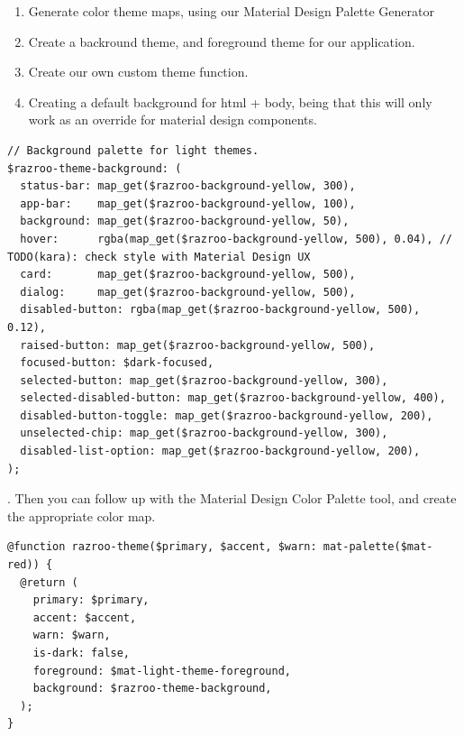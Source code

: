 \begin{enumerate}
  \item Generate color theme maps, using our Material Design Palette Generator
  \item Create a backround theme, and foreground theme for our application.
  \item Create our own custom theme function.
  \item Creating a default background for html + body, being that this will 
  only work as an override for material design components. 
\end{enumerate}

\begin{lstlisting}[caption=Example of what a custom background theme looks like.]
// Background palette for light themes.
$razroo-theme-background: (
  status-bar: map_get($razroo-background-yellow, 300),
  app-bar:    map_get($razroo-background-yellow, 100),
  background: map_get($razroo-background-yellow, 50),
  hover:      rgba(map_get($razroo-background-yellow, 500), 0.04), // TODO(kara): check style with Material Design UX
  card:       map_get($razroo-background-yellow, 500),
  dialog:     map_get($razroo-background-yellow, 500),
  disabled-button: rgba(map_get($razroo-background-yellow, 500), 0.12),
  raised-button: map_get($razroo-background-yellow, 500),
  focused-button: $dark-focused,
  selected-button: map_get($razroo-background-yellow, 300),
  selected-disabled-button: map_get($razroo-background-yellow, 400),
  disabled-button-toggle: map_get($razroo-background-yellow, 200),
  unselected-chip: map_get($razroo-background-yellow, 300),
  disabled-list-option: map_get($razroo-background-yellow, 200),
);
\end{lstlisting}

.
Then you can follow up with the Material Design Color Palette tool, and
create the appropriate color map.

\begin{lstlisting}[caption=What custom theme function would look like]
@function razroo-theme($primary, $accent, $warn: mat-palette($mat-red)) {
  @return (
    primary: $primary,
    accent: $accent,
    warn: $warn,
    is-dark: false,
    foreground: $mat-light-theme-foreground,
    background: $razroo-theme-background,
  );
}  
\end{lstlisting}

